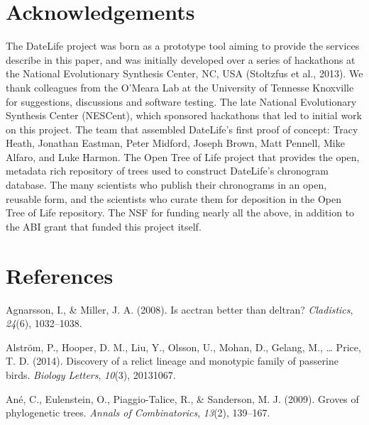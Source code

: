 \documentclass[english,man]{apa6}
\begin{document}
\hypertarget{acknowledgements}{%
\section{Acknowledgements}\label{acknowledgements}}

The DateLife project was born as a prototype tool aiming to provide the services describe in this paper, and was initially developed over a series of hackathons at the National Evolutionary Synthesis Center, NC, USA (Stoltzfus et al., 2013).
We thank colleagues from the O'Meara Lab at the University
of Tennesse Knoxville for suggestions, discussions and software testing.
The late National Evolutionary Synthesis Center (NESCent), which sponsored hackathons
that led to initial work on this project. The team that assembled DateLife's first proof of concept: Tracy Heath, Jonathan Eastman, Peter Midford, Joseph Brown, Matt Pennell, Mike Alfaro, and Luke Harmon.
The Open Tree of Life project that provides the open, metadata rich repository of
trees used to construct DateLife's chronogram database.
The many scientists who publish their chronograms in an open, reusable form, and the scientists who curate them for deposition in the Open Tree of Life repository.
The NSF for funding nearly all the above, in addition to the ABI grant that funded this project itself.

\newpage

\hypertarget{references}{%
\section{References}\label{references}}

\begingroup
\setlength{\parindent}{-0.5in}
\setlength{\leftskip}{0.5in}

\hypertarget{refs}{}
\leavevmode\hypertarget{ref-agnarsson2008acctran}{}%
Agnarsson, I., \& Miller, J. A. (2008). Is acctran better than deltran? \emph{Cladistics}, \emph{24}(6), 1032--1038.

\leavevmode\hypertarget{ref-alstrom2014discovery}{}%
Alström, P., Hooper, D. M., Liu, Y., Olsson, U., Mohan, D., Gelang, M., \ldots{} Price, T. D. (2014). Discovery of a relict lineage and monotypic family of passerine birds. \emph{Biology Letters}, \emph{10}(3), 20131067.

\leavevmode\hypertarget{ref-ane2009groves}{}%
Ané, C., Eulenstein, O., Piaggio-Talice, R., \& Sanderson, M. J. (2009). Groves of phylogenetic trees. \emph{Annals of Combinatorics}, \emph{13}(2), 139--167.
\end{document}
